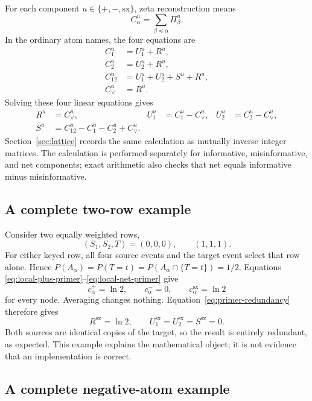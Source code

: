 \documentclass[11pt]{article}
\theoremstyle{definition}
\newcommand{\sx}{\mathrm{sx}}
\begin{document}
For each component $u\in\{+,-,\sx\}$, zeta reconstruction means
\[
  C_\alpha^u=\sum_{\beta\preceq\alpha}\Pi_\beta^u.
\]
In the ordinary atom names, the four equations are
\begin{align}
  C^u_1&=U^u_1+R^u,\\
  C^u_2&=U^u_2+R^u,\\
  C^u_{12}&=U^u_1+U^u_2+S^u+R^u,\\
  C^u_\vee&=R^u.\label{eq:primer-redundancy}
\end{align}
Solving these four linear equations gives
\begin{align}
  R^u&=C^u_\vee,&
  U^u_1&=C^u_1-C^u_\vee,&
  U^u_2&=C^u_2-C^u_\vee,\\
  S^u&=C^u_{12}-C^u_1-C^u_2+C^u_\vee.
\end{align}
Section~\ref{sec:lattice} records the same calculation as mutually inverse integer matrices.  The
calculation is performed separately for informative, misinformative, and net components; exact
arithmetic also checks that net equals informative minus misinformative.

\subsection{A complete two-row example}

Consider two equally weighted rows,
\begin{equation}
  (S_1,S_2,T)=(0,0,0),\qquad (1,1,1).
\end{equation}
For either keyed row, all four source events and the target event select that row alone.  Hence
$P(A_\alpha)=P(T=t)=P(A_\alpha\cap\{T=t\})=1/2$.  Equations
\eqref{eq:local-plus-primer}--\eqref{eq:local-net-primer} give
\begin{equation}
  c^+_\alpha=\ln2,\qquad c^-_\alpha=0,\qquad c^\sx_\alpha=\ln2
\end{equation}
for every node.  Averaging changes nothing.  Equation~\eqref{eq:primer-redundancy} therefore gives
\begin{equation}
  R^\sx=\ln2,\qquad U^\sx_1=U^\sx_2=S^\sx=0.
\end{equation}
Both sources are identical copies of the target, so the result is entirely redundant, as expected.
This example explains the mathematical object; it is not evidence that an implementation is
correct.

\subsection{A complete negative-atom example}
\end{document}
